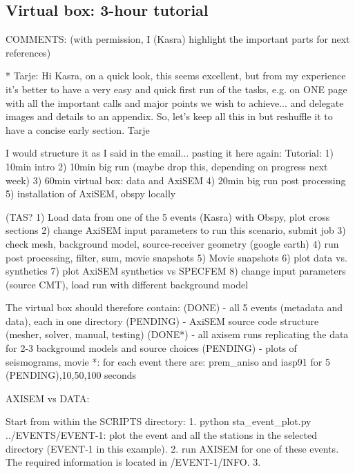 \subsection{Virtual box: 3-hour tutorial}

COMMENTS: (with permission, I (Kasra) highlight the important parts for next references)

* Tarje:
Hi Kasra, on a quick look, this seems excellent, but from my experience it's better to have a very easy and quick first run of the tasks, e.g. on ONE page with all the important calls and major points we wish to achieve... and delegate images and details to an appendix. So, let's keep all this in but reshuffle it to have a concise early section. Tarje

I would structure it as I said in the email... pasting it here again:
Tutorial:
1) 10min intro
2) 10min big run (maybe drop this, depending on progress next week)
3) 60min virtual box: data and AxiSEM
4) 20min big run post processing
5) installation of AxiSEM, obspy locally

(TAS?
1) Load data from one of the 5 events (Kasra) with Obspy, plot cross sections
2) change AxiSEM input parameters to run this scenario, submit job
3) check mesh, background model, source-receiver geometry (google earth)
4) run post processing, filter, sum, movie snapshots
5) Movie snapshots
6) plot data vs. synthetics
7) plot AxiSEM synthetics vs SPECFEM
8) change input parameters (source CMT), load run with different background model

The virtual box should therefore contain:
(DONE)        - all 5 events (metadata and data), each in one directory
(PENDING) - AxiSEM source code structure (mesher, solver, manual, testing)
(DONE*)       - all axisem runs replicating the data for 2-3 background models and source choices
(PENDING)  - plots of seismograms, movie
*: for each event there are: prem\_aniso and iasp91 for 5 (PENDING),10,50,100 seconds



AXISEM vs DATA:


Start from within the SCRIPTS directory:
1. python sta\_event\_plot.py ../EVENTS/EVENT-1: plot the event and all the stations in the selected directory (EVENT-1 in this example).
2. run AXISEM for one of these events. The required information is located in /EVENT-1/INFO.
3.



































